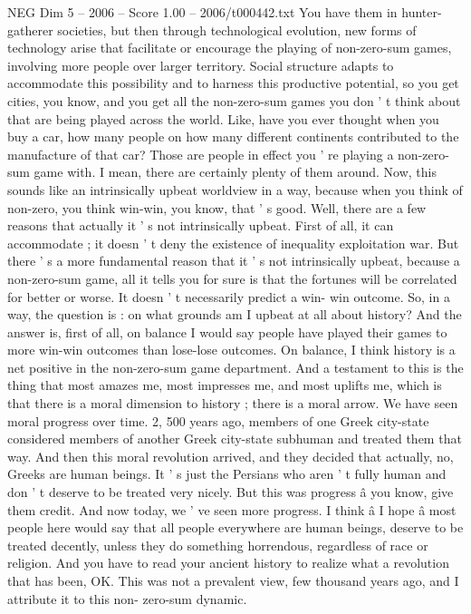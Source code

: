 \begin{textsample}{NEG Dim 5 – 2006 – Score 1.00 – 2006/t000442.txt}
You have them in hunter-gatherer societies, but then through technological evolution, new forms of technology arise that facilitate or encourage the playing of non-zero-sum games, involving more people over larger territory.
Social structure adapts to accommodate this possibility and to harness this productive potential, so you get cities, you know, and you get all the non-zero-sum games you don ' t think about that are being played across the world.
Like, have you ever thought when you buy a car, how many people on how many different continents contributed to the manufacture of that car?
Those are people in effect you ' re playing a non-zero-sum game with.
I mean, there are certainly plenty of them around.
Now, this sounds like an intrinsically upbeat worldview in a way, because when you think of non-zero, you think win-win, you know, that ' s good.
Well, there are a few reasons that actually it ' s not intrinsically upbeat.
First of all, it can accommodate ; it doesn ' t deny the existence of inequality exploitation war.
But there ' s a more fundamental reason that it ' s not intrinsically upbeat, because a non-zero-sum game, all it tells you for sure is that the fortunes will be correlated for better or worse.
It doesn ' t necessarily predict a win- win outcome.
So, in a way, the question is : on what grounds am I upbeat at all about history?
And the answer is, first of all, on balance I would say people have played their games to more win-win outcomes than lose-lose outcomes.
On balance, I think history is a net positive in the non-zero-sum game department.
And a testament to this is the thing that most amazes me, most impresses me, and most uplifts me, which is that there is a moral dimension to history ; there is a moral arrow.
We have seen moral progress over time. 2, 500 years ago, members of one Greek city-state considered members of another Greek city-state subhuman and treated them that way.
And then this moral revolution arrived, and they decided that actually, no, Greeks are human beings.
It ' s just the Persians who aren ' t fully human and don ' t deserve to be treated very nicely.
But this was progress â you know, give them credit.
And now today, we ' ve seen more progress.
I think â I hope â most people here would say that all people everywhere are human beings, deserve to be treated decently, unless they do something horrendous, regardless of race or religion.
And you have to read your ancient history to realize what a revolution that has been, OK.
This was not a prevalent view, few thousand years ago, and I attribute it to this non- zero-sum dynamic.

\end{textsample}
